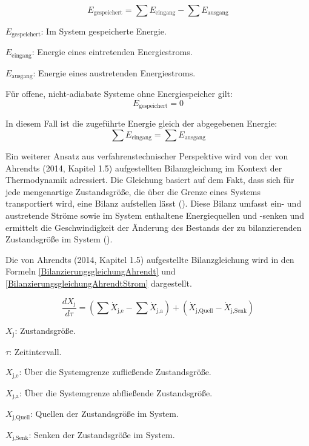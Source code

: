 \begin{equation}
E_{\text{gespeichert}} = \sum E_{\text{eingang}} - \sum E_{\text{ausgang}}
\label{energiebilanzierungsgleichung_Rönsch}
\end{equation}

\begin{description}
    \item \(E_{\text{gespeichert}}\): Im System gespeicherte Energie.
    \item \(E_{\text{eingang}}\): Energie eines eintretenden Energiestroms.
    \item \(E_{\text{ausgang}}\): Energie eines austretenden Energiestroms.
    \item Für offene, nicht-adiabate Systeme ohne Energiespeicher gilt:
    \[
    E_{\text{gespeichert}} = 0
    \]
    \item In diesem Fall ist die zugeführte Energie gleich der abgegebenen Energie:
    \[
    \sum E_{\text{eingang}} = \sum E_{\text{ausgang}}
    \]
\end{description}

Ein weiterer Ansatz aus verfahrenstechnischer Perspektive wird von der von Ahrendts (2014, Kapitel 1.5) aufgestellten Bilanzgleichung im Kontext der Thermodynamik 
adressiert.
Die Gleichung basiert auf dem Fakt, dass sich für jede mengenartige Zustandsgröße, die über die Grenze eines Systems transportiert wird, eine Bilanz aufstellen lässt 
(\cite[Kapitel 1.5]{Ahrendts.2014}).
Diese Bilanz umfasst ein- und austretende Ströme sowie im System enthaltene Energiequellen und -senken und ermittelt die Geschwindigkeit der Änderung des Bestands der 
zu bilanzierenden Zustandsgröße im System (\cite[Kapitel 1.5]{Ahrendts.2014}).

Die von Ahrendts (2014, Kapitel 1.5) aufgestellte Bilanzgleichung wird in den Formeln \eqref{BilanzierungsgleichungAhrendt} und 
\eqref{BilanzierungsgleichungAhrendtStrom} dargestellt.

\begin{equation}
    \frac{dX_{\text{j}}}{d\tau} = (\sum \dot{X}_{\text{j,e}} - \sum \dot{X}_{\text{j,a}}) + (\dot{X}_{\text{j,Quell}} - \dot{X}_{\text{j,Senk}})
    \label{BilanzierungsgleichungAhrendt}
\end{equation}

\begin{description}
    \item \(X_{\text{j}}\): Zustandsgröße.
    \item \(\tau\): Zeitintervall.
    \item \(X_{\text{j,e}}\): Über die Systemgrenze zufließende Zustandsgröße.
    \item \(X_{\text{j,a}}\): Über die Systemgrenze abfließende Zustandsgröße.
    \item \(X_{\text{j,Quell}}\): Quellen der Zustandsgröße im System.
    \item \(X_{\text{j,Senk}}\): Senken der Zustandsgröße im System.
\end{description}



